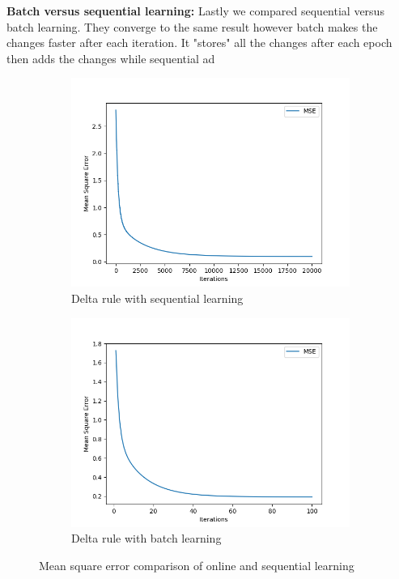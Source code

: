 \documentclass[a4paper]{article}
\begin{document}
\newpage
\textbf{Batch versus sequential learning:} Lastly we compared sequential versus batch learning. They converge to the same result however batch makes the changes faster after each iteration. It "stores" all the changes after each epoch then adds the changes while sequential ad
\begin{figure}[htb]
    \centering
    \begin{subfigure}{0.4\textwidth}
        \includegraphics[width=\textwidth]{Labs/Lab 1/Lab 1a/Results/delta-linear-seperable-bias-sequential.png}
        \caption{Delta rule with sequential learning}
        \label{fig:Delta Rule with sequential learning}
    \end{subfigure}
    \hfill
    \begin{subfigure}{0.4\textwidth}
        \includegraphics[width=\textwidth]{Labs/Lab 1/Lab 1a/Results/delta-linear-seperable-bias-BATCH.png}
        \caption{Delta rule with batch learning}
        \label{fig:DeltaRule with batch learning}
    \end{subfigure}
    \caption{Mean square error comparison of online and sequential learning}
    \label{fig:DeltaRule-NoBias}
\end{figure}
\end{document}
